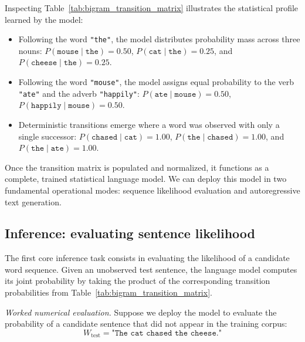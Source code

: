 \documentclass[../../main.tex]{subfiles}
\begin{document}
Inspecting Table~\ref{tab:bigram_transition_matrix} illustrates the statistical profile learned by the model:
\begin{itemize}
    \item Following the word \texttt{"the"}, the model distributes probability mass across three nouns: $P(\texttt{mouse} \mid \texttt{the}) = 0.50$, $P(\texttt{cat} \mid \texttt{the}) = 0.25$, and $P(\texttt{cheese} \mid \texttt{the}) = 0.25$.
    \item Following the word \texttt{"mouse"}, the model assigns equal probability to the verb \texttt{"ate"} and the adverb \texttt{"happily"}: $P(\texttt{ate} \mid \texttt{mouse}) = 0.50$, $P(\texttt{happily} \mid \texttt{mouse}) = 0.50$.
    \item Deterministic transitions emerge where a word was observed with only a single successor: $P(\texttt{chased} \mid \texttt{cat}) = 1.00$, $P(\texttt{the} \mid \texttt{chased}) = 1.00$, and $P(\texttt{the} \mid \texttt{ate}) = 1.00$.
\end{itemize}

Once the transition matrix is populated and normalized, it functions as a complete, trained statistical language model. We can deploy this model in two fundamental operational modes: sequence likelihood evaluation and autoregressive text generation.

\subsection{Inference: evaluating sentence likelihood}
\label{subsec:evaluating_sentence_likelihood}

The first core inference task consists in evaluating the likelihood of a candidate word sequence. Given an unobserved test sentence, the language model computes its joint probability by taking the product of the corresponding transition probabilities from Table~\ref{tab:bigram_transition_matrix}.

\textit{Worked numerical evaluation.} Suppose we deploy the model to evaluate the probability of a candidate sentence that did not appear in the training corpus:
\begin{equation}
W_{\text{test}} = \texttt{"The cat chased the cheese."}
\end{equation}
\end{document}
